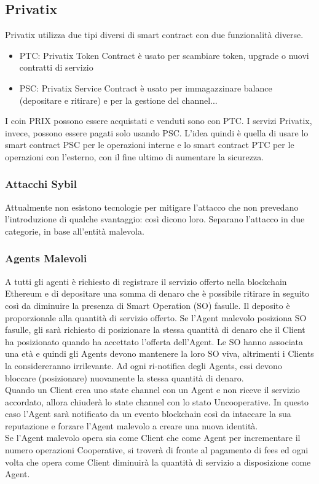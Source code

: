 \documentclass[]{article}
\begin{document}
	
	
	
	
	
	
	
	\subsection{Privatix}	
	Privatix utilizza due tipi diversi di smart contract con due funzionalità diverse.	
	\begin{itemize}
	\item PTC: Privatix Token Contract è usato per scambiare token, upgrade o nuovi contratti di servizio
	\item PSC: Privatix Service Contract è usato per immagazzinare balance (depositare e ritirare) e per la gestione del channel...
	\end{itemize}	
	I coin PRIX possono essere acquistati e venduti sono con PTC. I servizi Privatix, invece, possono essere pagati solo usando PSC.
	L’idea quindi è quella di usare lo smart contract PSC per le operazioni interne e lo smart contract PTC per le operazioni con l’esterno, con il fine ultimo di aumentare la sicurezza.	
	\subsubsection{Attacchi Sybil}	
	Attualmente non esistono tecnologie per mitigare l’attacco che non prevedano l’introduzione di qualche svantaggio: così dicono loro.
	Separano l’attacco in due categorie, in base all’entità malevola.	
	\subsubsection{Agents Malevoli}	
	A tutti gli agenti è richiesto di registrare il servizio offerto nella blockchain Ethereum e di depositare una somma di denaro che è possibile ritirare in seguito così da diminuire la presenza di Smart Operation (SO) fasulle. Il deposito è proporzionale alla quantità di servizio offerto.
	Se l’Agent malevolo posiziona SO fasulle, gli sarà richiesto di posizionare la stessa quantità di denaro che il Client ha posizionato quando ha accettato l’offerta dell’Agent.
	Le SO hanno associata una età e quindi gli Agents devono mantenere la loro SO viva, altrimenti i Clients la considereranno irrilevante.
	Ad ogni ri-notifica degli Agents, essi devono bloccare (posizionare) nuovamente la stessa quantità di denaro.\\	
	Quando un Client crea uno state channel con un Agent e non riceve il servizio accordato, allora chiuderà lo state channel con lo stato Uncooperative. In questo caso l’Agent sarà notificato da un evento blockchain così da intaccare la sua reputazione e forzare l’Agent malevolo a creare una nuova identità.\\	
	Se l’Agent malevolo opera sia come Client che come Agent per incrementare il numero operazioni Cooperative, si troverà di fronte al pagamento di fees ed ogni volta che opera come Client diminuirà la quantità di servizio a disposizione come Agent.	
\end{document}
